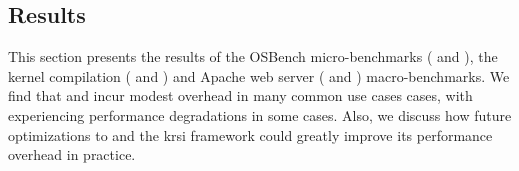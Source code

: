 




\subsection{Results}%
\label{ss:eval-results}

This section presents the results of the OSBench micro-benchmarks ( and
), the kernel
compilation ( and ) and
Apache web server ( and )
macro-benchmarks. We find that \bpfbox{} and \bpfcontain{} incur modest overhead in many
common use cases cases, with \bpfcontain{} experiencing performance degradations in some
cases. Also, we discuss how future optimizations to \bpfcontain{} and the \gls{krsi}
framework could greatly improve its performance overhead in practice.


